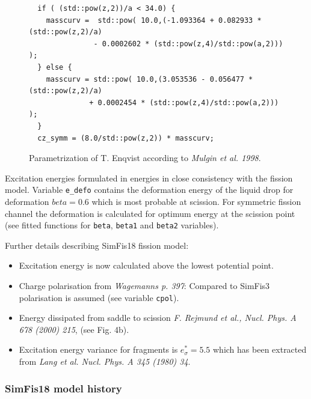 \begin{figure}
\begin{verbatim}
  if ( (std::pow(z,2))/a < 34.0) {
    masscurv =  std::pow( 10.0,(-1.093364 + 0.082933 * (std::pow(z,2)/a)
			   - 0.0002602 * (std::pow(z,4)/std::pow(a,2))) );
  } else {
    masscurv = std::pow( 10.0,(3.053536 - 0.056477 * (std::pow(z,2)/a)
			  + 0.0002454 * (std::pow(z,4)/std::pow(a,2))) );
  }
  cz_symm = (8.0/std::pow(z,2)) * masscurv;
\end{verbatim}
\caption{Parametrization of T. Enqvist according to \emph{Mulgin et
    al. 1998}.}
\label{fig:masscurv}
\end{figure}


Excitation energies formulated in energies in close consistency with
the fission model.
Variable {\tt e\_defo} contains the deformation energy of the liquid
drop for deformation $beta = 0.6$ which is most probable at scission.
For symmetric fission channel the deformation is calculated for
optimum energy at the scission point (see fitted functions for
{\tt beta}, {\tt beta1} and {\tt beta2} variables).

Further details describing {\sf SimFis18} fission model:
\begin{itemize}
\item Excitation energy is now calculated above the lowest potential
  point. %
\item Charge polarisation from \emph{Wagemanns p. 397}: Compared to
  {\sf SimFis3} polarisation is assumed (see variable {\tt cpol}).
\item Energy dissipated from saddle to scission \emph{F. Rejmund et
  al., Nucl. Phys. A 678 (2000) 215}, (see Fig. 4b).
\item Excitation energy variance for fragments is $e^*_{\sigma} = 5.5$
  which has been extracted from \emph{Lang et al. Nucl. Phys. A 345
    (1980) 34}.
\end{itemize}

\subsubsection{SimFis18 model history}

